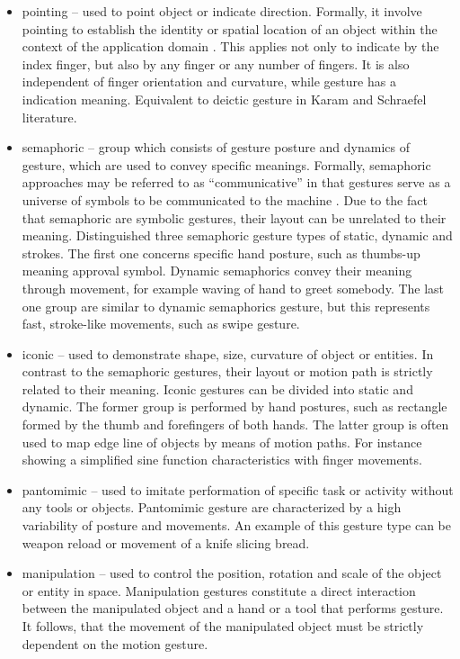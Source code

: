 \begin{itemize}

\item pointing -- used to point object or indicate direction. Formally, it involve pointing to establish the identity or spatial location of an object within the context of the application domain \cite{Karam05ataxonomy}. This applies not only to indicate by the index finger, but also by any finger or any number of fingers. It is also independent of finger orientation and curvature, while gesture has a indication meaning. Equivalent to deictic gesture in Karam and Schraefel literature.

\item semaphoric -- group which consists of gesture posture and dynamics of gesture, which are used to convey specific meanings. Formally, semaphoric approaches may be referred to as ``communicative'' in that gestures serve as a universe of symbols to be communicated to the machine \cite{Quek:2002:MHD:568513.568514}. Due to the fact that semaphoric are symbolic gestures, their layout can be unrelated to their meaning. Distinguished three semaphoric gesture types of static, dynamic and strokes. The first one concerns specific hand posture, such as thumbs-up meaning approval symbol.
Dynamic semaphorics convey their meaning through movement, for example waving of hand to greet somebody. The last one group are similar to dynamic semaphorics gesture, but this represents fast, stroke-like movements, such as swipe gesture.

\item iconic -- used to demonstrate shape, size, curvature of object or entities. In contrast to the semaphoric gestures, their layout or motion path is strictly related to their meaning. Iconic gestures can be divided into static and dynamic. The former group is performed by hand postures, such as rectangle formed by the thumb and forefingers of both hands. The latter group is often used to map edge line of objects by means of motion paths. For instance showing a simplified sine function characteristics with finger movements.

\item pantomimic -- used to imitate performation of specific task or activity without any tools or objects. Pantomimic gesture are characterized by a high variability of posture and movements. An example of this gesture type can be weapon reload or movement of a knife slicing bread.

\item manipulation -- used to control the position, rotation and scale of the object or entity in space. Manipulation gestures constitute a direct interaction between the manipulated object and a hand or a tool that performs gesture. It follows, that the movement of the manipulated object must be strictly dependent on the motion gesture.
\end{itemize}

